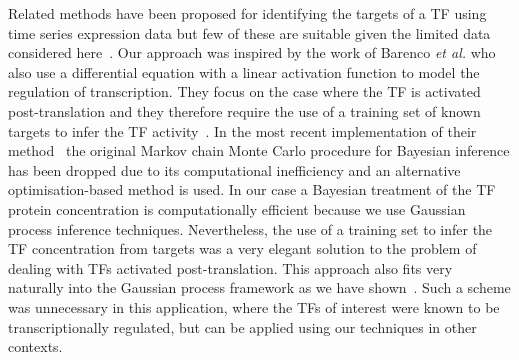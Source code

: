 \documentclass{pnastwo}
\begin{document}
\begin{article}
Related methods have been proposed for identifying the
targets of a TF using time series expression data but few of these are suitable given the
limited data considered here~\cite{Bansal2007a}. Our approach was inspired by the work of Barenco {\em et
al.} who also use a differential equation with a linear activation
function to model the regulation of transcription. They focus on the
case where the TF is activated post-translation and they therefore
require the use of a training set of
known targets to infer the TF activity~\cite{Barenco2006a}. In the most recent
implementation of their method~\cite{Barenco2009} the original Markov
chain Monte Carlo procedure for Bayesian inference has been dropped due to its computational
inefficiency and an alternative optimisation-based method is used. In our case a Bayesian treatment of the TF protein
concentration is computationally efficient because we use Gaussian
process inference techniques.
Nevertheless, the use of a training set to infer the
TF concentration from targets was a very elegant solution to the
problem of dealing with TFs activated post-translation. This
approach also fits very naturally into the Gaussian process
framework as we have shown~\cite{Gao2008}. Such a scheme was unnecessary in
this application,
where the TFs of interest were known to be transcriptionally
regulated, but can be applied using our techniques in other
contexts.


\end{article}
\end{document}
